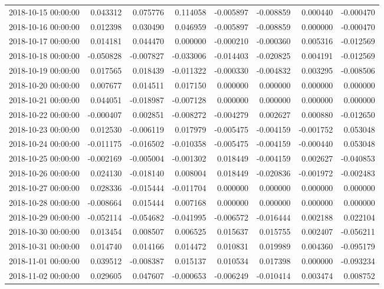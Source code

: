 \begin{tabular}{lrrrrrrr}
2018-10-15 00:00:00 & 0.043312 & 0.075776 & 0.114058 & -0.005897 & -0.008859 & 0.000440 & -0.000470 \\
2018-10-16 00:00:00 & 0.012398 & 0.030490 & 0.046959 & -0.005897 & -0.008859 & 0.000000 & -0.000470 \\
2018-10-17 00:00:00 & 0.014181 & 0.044470 & 0.000000 & -0.000210 & -0.000360 & 0.005316 & -0.012569 \\
2018-10-18 00:00:00 & -0.050828 & -0.007827 & -0.033006 & -0.014403 & -0.020825 & 0.004191 & -0.012569 \\
2018-10-19 00:00:00 & 0.017565 & 0.018439 & -0.011322 & -0.000330 & -0.004832 & 0.003295 & -0.008506 \\
2018-10-20 00:00:00 & 0.007677 & 0.014511 & 0.017150 & 0.000000 & 0.000000 & 0.000000 & 0.000000 \\
2018-10-21 00:00:00 & 0.044051 & -0.018987 & -0.007128 & 0.000000 & 0.000000 & 0.000000 & 0.000000 \\
2018-10-22 00:00:00 & -0.000407 & 0.002851 & -0.008272 & -0.004279 & 0.002627 & 0.000880 & -0.012650 \\
2018-10-23 00:00:00 & 0.012530 & -0.006119 & 0.017979 & -0.005475 & -0.004159 & -0.001752 & 0.053048 \\
2018-10-24 00:00:00 & -0.011175 & -0.016502 & -0.010358 & -0.005475 & -0.004159 & -0.000440 & 0.053048 \\
2018-10-25 00:00:00 & -0.002169 & -0.005004 & -0.001302 & 0.018449 & -0.004159 & 0.002627 & -0.040853 \\
2018-10-26 00:00:00 & 0.024130 & -0.018140 & 0.008004 & 0.018449 & -0.020836 & -0.001972 & -0.002483 \\
2018-10-27 00:00:00 & 0.028336 & -0.015444 & -0.011704 & 0.000000 & 0.000000 & 0.000000 & 0.000000 \\
2018-10-28 00:00:00 & -0.008664 & 0.015444 & 0.007168 & 0.000000 & 0.000000 & 0.000000 & 0.000000 \\
2018-10-29 00:00:00 & -0.052114 & -0.054682 & -0.041995 & -0.006572 & -0.016444 & 0.002188 & 0.022104 \\
2018-10-30 00:00:00 & 0.013454 & 0.008507 & 0.006525 & 0.015637 & 0.015755 & 0.002407 & -0.056211 \\
2018-10-31 00:00:00 & 0.014740 & 0.014166 & 0.014472 & 0.010831 & 0.019989 & 0.004360 & -0.095179 \\
2018-11-01 00:00:00 & 0.039512 & -0.008387 & 0.015137 & 0.010534 & 0.017398 & 0.000000 & -0.093234 \\
2018-11-02 00:00:00 & 0.029605 & 0.047607 & -0.000653 & -0.006249 & -0.010414 & 0.003474 & 0.008752 \\

\end{tabular}
